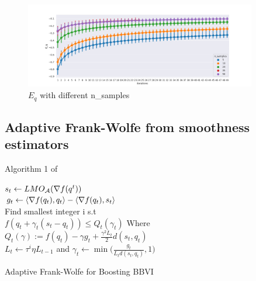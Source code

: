 \documentclass[summaries.tex]{subfiles}
\begin{document}
\begin{figure}[h] \label{fig:eq}
  \centering
  \includegraphics[width=0.9\textwidth]{plots/test_e_q.png}
  \caption{$E_q$ with different n\_samples}
  \small{}
\end{figure}

\subsection{Adaptive Frank-Wolfe from smoothness estimators}
Algorithm 1 of \cite{pedregosa2018step}
\begin{algorithm}[h]
  \KwIn{$q_0 \in \data$, initial Lipschitz estimate $L_{-1}$, line search parameters
  $\tau > 1, \eta \in (0, 1]$}
   {
    $s_t \gets LMO_{\mathcal{A}}(\nabla f(q^t))$\\
    $g_t \gets \langle \nabla f(q_t), q_t \rangle - 
    \langle \nabla f(q_t), s_t \rangle$ \\
    Find smallest integer i s.t\\ {
      $f(q_t + \gamma_t(s_t - q_t)) \leq Q_t(\gamma_t)$ Where\\
      $Q_t(\gamma) := f(q_t) - \gamma g_t + \frac{\gamma^2 L_t}{2}d(s_t, q_t)$
      \\
      $L_t \gets \tau^i\eta L_{t-1}$ and
      $\gamma_t \gets \min\Big(\frac{g_t}{L_t d(s_t, q_t)}, 1\Big)$
    }
  }
  \label{alg:adafw}
  \caption{Adaptive Frank-Wolfe for Boosting BBVI}
\end{algorithm}

\end{document}
